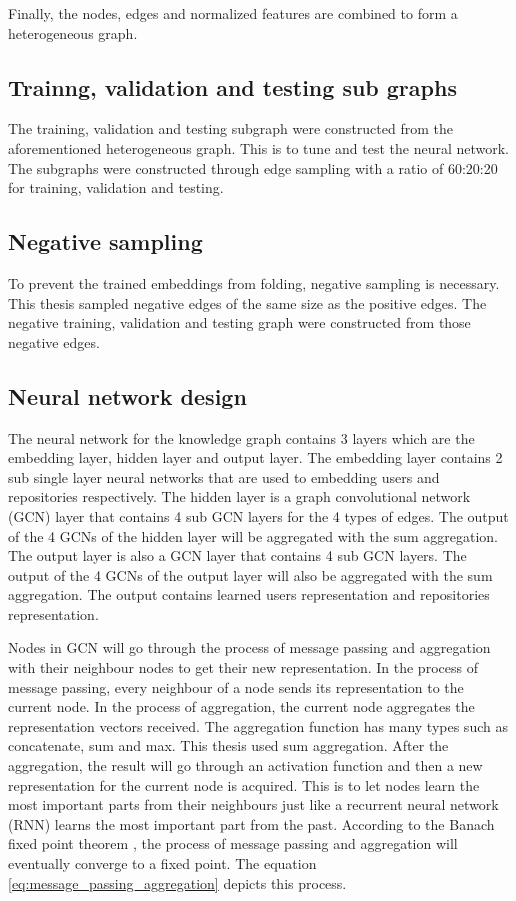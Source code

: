 \documentclass[11pt,twoside]{report}
\begin{document}
Finally, the nodes, edges and normalized features are combined to form a heterogeneous graph.

\subsection{Trainng, validation and testing sub graphs}
The training, validation and testing subgraph were constructed from the aforementioned heterogeneous graph. This is to tune and test the neural network. The subgraphs were constructed through edge sampling with a ratio of 60:20:20 for training, validation and testing.

\subsection{Negative sampling}
To prevent the trained embeddings from folding, negative sampling is necessary. This thesis sampled negative edges of the same size as the positive edges. The negative training, validation and testing graph were constructed from those negative edges.

\subsection{Neural network design}
The neural network for the knowledge graph contains 3 layers which are the embedding layer, hidden layer and output layer. The embedding layer contains 2 sub single layer neural networks that are used to embedding users and repositories respectively. The hidden layer is a graph convolutional network (GCN) \cite{kipf_semi-supervised_2017} layer that contains 4 sub GCN layers for the 4 types of edges. The output of the 4 GCNs of the hidden layer will be aggregated with the sum aggregation. The output layer is also a GCN layer that contains 4 sub GCN layers. The output of the 4 GCNs of the output layer will also be aggregated with the sum aggregation. The output contains learned users representation and repositories representation.

Nodes in GCN will go through the process of message passing and aggregation with their neighbour nodes to get their new representation. In the process of message passing, every neighbour of a node sends its representation to the current node. In the process of aggregation, the current node aggregates the representation vectors received. The aggregation function has many types such as concatenate, sum and max. This thesis used sum aggregation. After the aggregation, the result will go through an activation function and then a new representation for the current node is acquired. This is to let nodes learn the most important parts from their neighbours just like a recurrent neural network (RNN) learns the most important part from the past. According to the Banach
fixed point theorem \cite{Khamsi_2001}, the process of message passing and aggregation will eventually converge to a fixed point. The equation \ref{eq:message_passing_aggregation} depicts this process.
\end{document}
